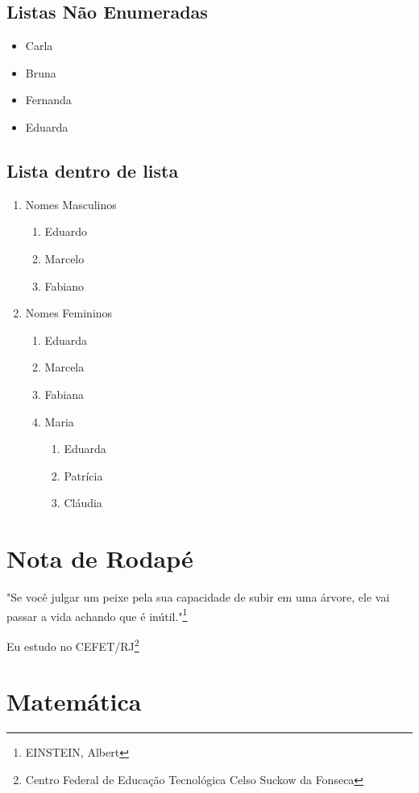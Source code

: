 \documentclass[12pt,a4paper]{article}
\begin{document}
\subsection{Listas Não Enumeradas}

\begin{itemize}
\item Carla
\item Bruna
\item Fernanda
\item Eduarda
\end{itemize}
\newpage


\subsection{Lista dentro de lista}
\label{ssc:ldl}
\begin{enumerate}
\item Nomes Masculinos
\begin{enumerate}
\item Eduardo
\item Marcelo
\item Fabiano
\end{enumerate}
\item Nomes Femininos
\begin{enumerate}
\item Eduarda
\item Marcela
\item Fabiana
\item Maria
\begin{enumerate}
\item Eduarda
\item Patrícia
\item Cláudia
\end{enumerate}
\end{enumerate}
\end{enumerate}


\section{Nota de Rodapé}

"Se você julgar um peixe pela sua capacidade de subir em uma árvore, ele vai passar a vida achando que é inútil."\footnote{EINSTEIN, Albert}

Eu estudo no CEFET/RJ\footnote{Centro Federal de Educação Tecnológica Celso Suckow da Fonseca}
	
\section{Matemática}
\end{document}

